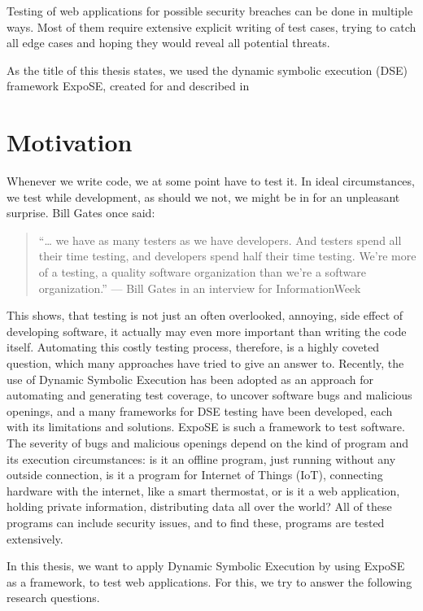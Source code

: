 Testing of web applications for possible security breaches can be done in multiple ways. Most of them require extensive explicit writing of test cases, trying to catch all edge cases and hoping they would reveal all potential threats. 

As the title of this thesis states, we used the dynamic symbolic execution (DSE) framework ExpoSE, created for and described in \citet{loring_expose_2017}


\section{Motivation}
\label{sec:motivation}

Whenever we write code, we at some point have to test it. In ideal circumstances, we test while development, as should we not, we might be in for an unpleasant surprise. Bill Gates once said:
\begin{quote}

    “… we have as many testers as we have developers. And testers spend all their time testing, and developers spend half their time testing. We're more of a testing, a quality software organization than we're a software organization.” — Bill Gates in an interview for InformationWeek \cite{bill_q_2002} 
\end{quote}
This shows, that testing is not just an often overlooked, annoying, side effect of developing software, it actually may even more important than writing the code itself.
Automating this costly testing process, therefore, is a highly coveted question, which many approaches have tried to give an answer to. 
Recently, the use of Dynamic Symbolic Execution has been adopted as an approach for automating and generating test coverage, to uncover software bugs and malicious openings, and a many frameworks for DSE testing have been developed, each with its limitations and solutions.
ExpoSE is such a framework to test software.\\
\cite{jhala_software_2009}
The severity of bugs and malicious openings depend on the kind of program and its execution circumstances: is it an offline program, just running without any outside connection, is it a program for Internet of Things (IoT), connecting hardware with the internet, like a smart thermostat, or is it a web application, holding private information, distributing data all over the world?
All of these programs can include security issues, and to find these, programs are tested extensively. 

In this thesis, we want to apply Dynamic Symbolic Execution by using ExpoSE as a framework, to test web applications. For this, we try to answer the following research questions.


